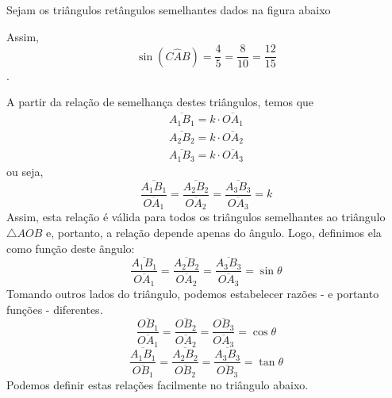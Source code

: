 \begin{exemplo}
Sejam os triângulos retângulos semelhantes dados na figura abaixo
\begin{figure}[H]
	\centering
\end{figure}
Assim, \[\sin(C\hat{A}B)=\frac{4}{5}=\frac{8}{10}=\frac{12}{15}\].

\end{exemplo}

A partir da relação de semelhança destes triângulos, temos que
\begin{align*}
\overline{A_1B_1} = k\cdot \overline{OA_1} \\
\overline{A_2B_2} = k\cdot \overline{OA_2} \\
\overline{A_1B_3} = k\cdot \overline{OA_3}
\end{align*}
ou seja,
\[\dfrac{\overline{A_1B_1} }{\overline{OA_1} } =\dfrac{\overline{A_2B_2} }{\overline{OA_2} } =\dfrac{\overline{A_3B_3} }{\overline{OA_3} }=k \]
Assim, esta relação é válida para todos os triângulos semelhantes ao triângulo $\triangle AOB$ e, portanto, a relação depende apenas do ângulo. Logo, definimos ela como função deste ângulo:
\[\dfrac{\overline{A_1B_1} }{\overline{OA_1} } =\dfrac{\overline{A_2B_2} }{\overline{OA_2} } =\dfrac{\overline{A_3B_3} }{\overline{OA_3} }=\sin \theta \]
Tomando outros lados do triângulo, podemos estabelecer razões - e portanto funções - diferentes.
\[\dfrac{\overline{OB_1} }{\overline{OA_1} } =\dfrac{\overline{OB_2} }{\overline{OA_2} } =\dfrac{\overline{OB_3} }{\overline{OA_3} }=\cos \theta \]
\[\dfrac{\overline{A_1B_1} }{\overline{OB_1} } =\dfrac{\overline{A_2B_2} }{\overline{OB_2} } =\dfrac{\overline{A_3B_3} }{\overline{OB_3} }=\tan \theta \]
Podemos definir estas relações facilmente no triângulo abaixo.

